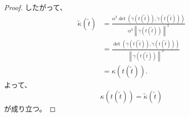 \documentclass[article,paper=a4paper]{jlreq}
\begin{document}
\begin{proof}
    したがって、
    \begin{align*}
        \tilde{\kappa}(\tilde{t})
        &=
        \frac{
            \alpha^3\det(\dot{\gamma}(t(\tilde{t})),\ddot{\gamma}(t(\tilde{t})))
        }{
            \alpha^3\left\|\dot{\gamma}(t(\tilde{t}))\right\|^3
        }\\
        &=
        \frac{
            \det(\dot{\gamma}(t(\tilde{t})),\ddot{\gamma}(t(\tilde{t})))
        }{
            \left\|\dot{\gamma}(t(\tilde{t}))\right\|^3
        }\\
        &=
        \kappa(t(\tilde{t})).
    \end{align*}
    よって、
    \[
        \kappa(t(\tilde{t}))=\tilde{\kappa}(\tilde{t})
    \]
    が成り立つ。
\end{proof}
\end{document}
